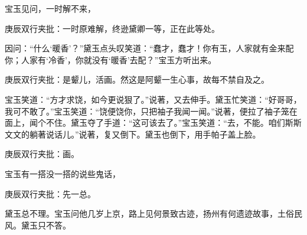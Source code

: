 \begin{parag}


    宝玉见问，一时解不来，\begin{note}庚辰双行夹批：一时原难解，终逊黛卿一等，正在此等处。\end{note}因问：“什么‘暖香’？”黛玉点头叹笑道：“蠢才，蠢才！你有玉，人家就有金来配你；人家有‘冷香’，你就没有‘暖香’去配？”宝玉方听出来。\begin{note}庚辰双行夹批：是颦儿，活画。然这是阿颦一生心事，故每不禁自及之。\end{note}宝玉笑道：“方才求饶，如今更说狠了。”说著，又去伸手。黛玉忙笑道：“好哥哥，我可不敢了。”宝玉笑道：“饶便饶你，只把袖子我闻一闻。”说著，便拉了袖子笼在面上，闻个不住。黛玉夺了手道：“这可该去了。”宝玉笑道：“去，不能。咱们斯斯文文的躺著说话儿。”说著，复又倒下。黛玉也倒下，用手帕子盖上脸。\begin{note}庚辰双行夹批：画。\end{note}宝玉有一搭没一搭的说些鬼话，\begin{note}庚辰双行夹批：先一总。\end{note}黛玉总不理。宝玉问他几岁上京，路上见何景致古迹，扬州有何遗迹故事，土俗民风。黛玉只不答。
\end{parag}


